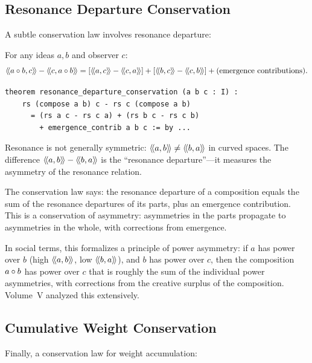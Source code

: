 \subsection{Resonance Departure Conservation}

A subtle conservation law involves resonance departure:

\begin{theorem}
\label{thm:resonance-departure}
For any ideas $a, b$ and observer $c$:
\[
  \rs{a \compose b}{c} - \rs{c}{a \compose b}
  = [\rs{a}{c} - \rs{c}{a}] + [\rs{b}{c} - \rs{c}{b}]
    + \text{(emergence contributions)}.
\]
\end{theorem}

\begin{lstlisting}[caption={Resonance departure (IDT\_v3\_Emergence.lean)}]
theorem resonance_departure_conservation (a b c : I) :
    rs (compose a b) c - rs c (compose a b)
      = (rs a c - rs c a) + (rs b c - rs c b)
        + emergence_contrib a b c := by ...
\end{lstlisting}

\begin{interpretation}
Resonance is not generally symmetric: $\langle\!\langle a, b \rangle\!\rangle \neq \langle\!\langle b, a \rangle\!\rangle$ in curved
spaces. The difference $\langle\!\langle a, b \rangle\!\rangle - \langle\!\langle b, a \rangle\!\rangle$ is the ``resonance departure''---it
measures the asymmetry of the resonance relation.

The conservation law says: the resonance departure of a composition equals the
sum of the resonance departures of its parts, plus an emergence contribution.
This is a conservation of asymmetry: asymmetries in the parts propagate to
asymmetries in the whole, with corrections from emergence.

In social terms, this formalizes a principle of power asymmetry: if $a$ has
power over $b$ (high $\langle\!\langle a, b \rangle\!\rangle$, low $\langle\!\langle b, a \rangle\!\rangle$), and $b$ has power over
$c$, then the composition $a \circ b$ has power over $c$ that is roughly
the sum of the individual power asymmetries, with corrections from the
creative surplus of the composition. Volume~V analyzed this extensively.
\end{interpretation}

\subsection{Cumulative Weight Conservation}

Finally, a conservation law for weight accumulation:

